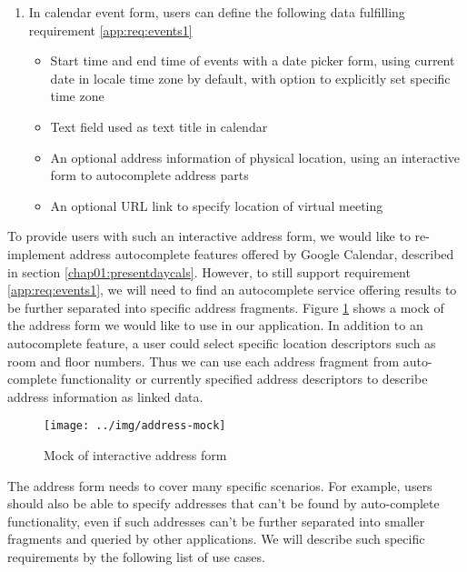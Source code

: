 \begin{enumerate}[label=\color{reqcolor}\textbf{R{\arabic*}}, resume]
    \item \label{app:req:events2} In calendar event form, users can define the following data fulfilling requirement \ref{app:req:events1}
        \begin{itemize}
            \item Start time and end time of events with a date picker form, using current date in locale time zone by default, with option to explicitly set specific time zone
            \item Text field used as text title in calendar
            \item An optional address information of physical location, using an interactive form to autocomplete address parts
            \item An optional URL link to specify location of virtual meeting
        \end{itemize}
\end{enumerate}

\newpage

To provide users with such an interactive address form, we would like to re-implement address autocomplete features offered by Google Calendar, described in section \ref{chap01:presentdaycals}. However, to still support requirement \ref{app:req:events1}, we will need to find an autocomplete service offering results to be further separated into specific address fragments.
Figure \ref{fig:spec:addressmock} shows a mock of the address form we would like to use in our application. In addition to an autocomplete feature, a user could select specific location descriptors such as room and floor numbers. Thus we can use each address fragment from auto-complete functionality or currently specified address descriptors to describe address information as linked data.

\begin{figure}[!htb]
	\centering
	\texttt{[image: ../img/address-mock]}
	\caption{Mock of interactive address form}
	\label{fig:spec:addressmock}
\end{figure}

The address form needs to cover many specific scenarios. For example, users should also be able to specify addresses that can't be found by auto-complete functionality, even if such addresses can't be further separated into smaller fragments and queried by other applications. We will describe such specific requirements by the following list of use cases.

